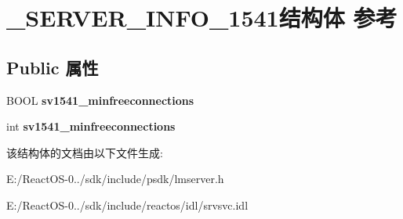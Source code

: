 \hypertarget{struct___s_e_r_v_e_r___i_n_f_o__1541}{}\section{\+\_\+\+S\+E\+R\+V\+E\+R\+\_\+\+I\+N\+F\+O\+\_\+1541结构体 参考}
\label{struct___s_e_r_v_e_r___i_n_f_o__1541}
\subsection*{Public 属性}
\begin{DoxyCompactItemize}
\item 
\mbox{\label{struct___s_e_r_v_e_r___i_n_f_o__1541_a27636442b0a61700479b97159d9b7779}} 
B\+O\+OL {\bfseries sv1541\+\_\+minfreeconnections}
\item 
\mbox{\label{struct___s_e_r_v_e_r___i_n_f_o__1541_a1c4c150caa5086304b569bbd007c6ee5}} 
int {\bfseries sv1541\+\_\+minfreeconnections}
\end{DoxyCompactItemize}


该结构体的文档由以下文件生成\+:\begin{DoxyCompactItemize}
\item 
E\+:/\+React\+O\+S-\/0../sdk/include/psdk/lmserver.\+h\item 
E\+:/\+React\+O\+S-\/0../sdk/include/reactos/idl/srvsvc.\+idl\end{DoxyCompactItemize}

